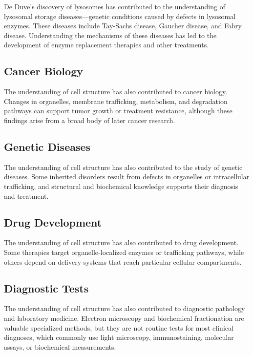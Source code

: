 De Duve's discovery of lysosomes has contributed to the understanding of lysosomal storage diseases---genetic conditions caused by defects in lysosomal enzymes. These diseases include Tay-Sachs disease, Gaucher disease, and Fabry disease. Understanding the mechanisms of these diseases has led to the development of enzyme replacement therapies and other treatments.

\subsection{Cancer Biology}

The understanding of cell structure has also contributed to cancer biology. Changes in organelles, membrane trafficking, metabolism, and degradation pathways can support tumor growth or treatment resistance, although these findings arise from a broad body of later cancer research.

\subsection{Genetic Diseases}

The understanding of cell structure has also contributed to the study of genetic diseases. Some inherited disorders result from defects in organelles or intracellular trafficking, and structural and biochemical knowledge supports their diagnosis and treatment.

\subsection{Drug Development}

The understanding of cell structure has also contributed to drug development. Some therapies target organelle-localized enzymes or trafficking pathways, while others depend on delivery systems that reach particular cellular compartments.

\subsection{Diagnostic Tests}

The understanding of cell structure has also contributed to diagnostic pathology and laboratory medicine. Electron microscopy and biochemical fractionation are valuable specialized methods, but they are not routine tests for most clinical diagnoses, which commonly use light microscopy, immunostaining, molecular assays, or biochemical measurements.


